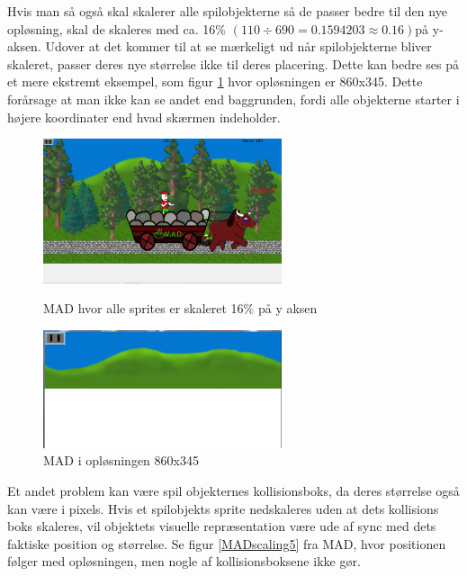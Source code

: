 \documentclass[Main.tex]{PositionOgSkalering}
\begin{document}
Hvis man så også skal skalerer alle spilobjekterne så de passer bedre til den nye opløsning, skal de skaleres med ca. 16\% \begin{math} (110 \div 690  = 0.1594203 \approx 0.16) \end{math}på y-aksen. Udover at det kommer til at se mærkeligt ud når spilobjekterne bliver skaleret, passer deres nye størrelse ikke til deres placering. Dette kan bedre ses på et mere ekstremt eksempel, som figur \ref{MADscaling4} hvor opløsningen er 860x345. Dette forårsage at man ikke kan se andet end baggrunden, fordi alle objekterne starter i højere koordinater end hvad skærmen indeholder.

\begin{figure}[h]
\centering
\parbox{7cm}{   
\includegraphics[width = 7cm]{billeder/MADscaling3}
\caption{MAD hvor alle sprites er skaleret 16\% på y aksen}    
\label{MADscaling3}}
\qquad
\begin{minipage}{7cm}
\includegraphics[width = 7cm]{billeder/MADscaling4}
\caption{MAD i opløsningen 860x345}    
\label{MADscaling4}
\end{minipage}
\end{figure}

Et andet problem kan være spil objekternes kollisionsboks, da deres størrelse også kan være i pixels. Hvis et spilobjekts sprite nedskaleres uden at dets kollisions boks skaleres, vil objektets visuelle repræsentation være ude af sync med dets faktiske position og størrelse. Se figur \ref{MADscaling5} fra MAD, hvor positionen følger med opløsningen, men nogle af kollisionsboksene ikke gør. 
\end{document}
